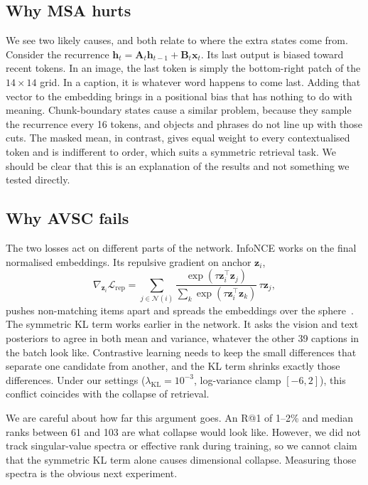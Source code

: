 \documentclass[pdflatex,sn-mathphys-num]{sn-jnl}
\begin{document}
\subsection{Why MSA hurts}
We see two likely causes, and both relate to where the extra states come from. Consider the recurrence $\mathbf{h}_t=\mathbf{A}_t\mathbf{h}_{t-1}+\mathbf{B}_t\mathbf{x}_t$. Its last output is biased toward recent tokens. In an image, the last token is simply the bottom-right patch of the $14\times14$ grid. In a caption, it is whatever word happens to come last. Adding that vector to the embedding brings in a positional bias that has nothing to do with meaning. Chunk-boundary states cause a similar problem, because they sample the recurrence every 16 tokens, and objects and phrases do not line up with those cuts. The masked mean, in contrast, gives equal weight to every contextualised token and is indifferent to order, which suits a symmetric retrieval task. We should be clear that this is an explanation of the results and not something we tested directly.

\subsection{Why AVSC fails}
The two losses act on different parts of the network. InfoNCE works on the final normalised embeddings. Its repulsive gradient on anchor $\mathbf{z}_i$,
\begin{equation}
\nabla_{\mathbf{z}_i}\mathcal{L}_{\mathrm{rep}}=\sum_{j\in\mathcal{N}(i)}\frac{\exp(\tau\mathbf{z}_i^\top\mathbf{z}_j)}{\sum_k\exp(\tau\mathbf{z}_i^\top\mathbf{z}_k)}\,\tau\mathbf{z}_j,
\label{eq:rep}
\end{equation}
pushes non-matching items apart and spreads the embeddings over the sphere~\cite{wang2020understanding}. The symmetric KL term works earlier in the network. It asks the vision and text posteriors to agree in both mean and variance, whatever the other 39 captions in the batch look like. Contrastive learning needs to keep the small differences that separate one candidate from another, and the KL term shrinks exactly those differences. Under our settings ($\lambda_{\mathrm{KL}}=10^{-3}$, log-variance clamp $[-6,2]$), this conflict coincides with the collapse of retrieval.

We are careful about how far this argument goes. An R@1 of 1--2\% and median ranks between 61 and 103 are what collapse would look like. However, we did not track singular-value spectra or effective rank during training, so we cannot claim that the symmetric KL term alone causes dimensional collapse. Measuring those spectra is the obvious next experiment.
\end{document}
